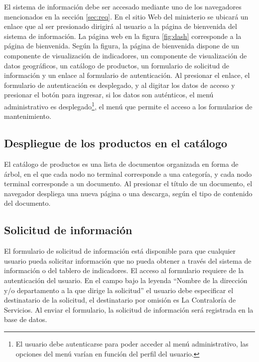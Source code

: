\documentclass[a4paper, 9pt, conference]{article}              %
\begin{document}
El sistema de informaci\'on debe ser accesado mediante uno de los navegadores mencionados en la secci\'on \ref{sec:req}. En el sitio Web del ministerio se ubicar\'a un enlace que al ser presionado dirigir\'a al usuario a la p\'agina de bienvenida del sistema de informaci\'on. La p\'agina web en la figura \ref{fig:dash} corresponde a la p\'agina de bienvenida. Seg\'un la figura, la p\'agina de bienvenida dispone de un componente de visualizaci\'on de indicadores, un componente de visualizaci\'on de datos geogr\'aficos, un cat\'alogo de productos, un formulario de solicitud de informaci\'on y un enlace al formulario de autenticaci\'on. Al presionar el enlace, el formulario de autenticaci\'on es desplegado, y al digitar los datos de acceso y presionar el bot\'on para ingresar, si los datos son aut\'enticos, el men\'u administrativo es desplegado\footnote{El usuario debe autenticarse para poder acceder al men\'u administrativo, las opciones del men\'u var\'ian en funci\'on del perfil del usuario.}, el men\'u que permite el acceso a los formularios de mantenimiento.


 
\subsection{Despliegue de los productos en el cat\'alogo}

El cat\'alogo de productos es una lista de documentos organizada en forma de \'arbol, en el que cada nodo no terminal corresponde a una categor\'ia, y cada nodo terminal corresponde a un documento. Al presionar el t\'itulo de un documento, el navegador despliega una nueva p\'agina o una descarga, seg\'un el tipo de contenido del documento.

\subsection{Solicitud de informaci\'on}

El formulario de solicitud de informaci\'on est\'a disponible para que cualquier usuario pueda solicitar informaci\'on que no pueda obtener a trav\'es del sistema de informaci\'on o del tablero de indicadores. El acceso al formulario requiere de la autenticaci\'on del usuario. En el campo bajo la leyenda ``Nombre de la direcci\'on y/o departamento a la que dirige la solicitud'' el usuario debe especificar el destinatario de la solicitud, el destinatario por omisi\'on es La Contralor\'ia de Servicios. Al enviar el formulario, la solicitud de informaci\'on ser\'a registrada en la base de datos.
\end{document}
